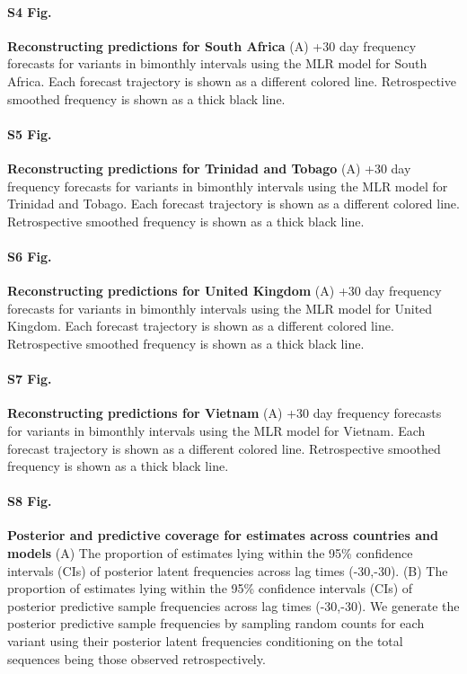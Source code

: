 \documentclass[10pt,letterpaper]{article}
\begin{document}
\paragraph*{S4 Fig.}
\label{fig:S4}
{\bf Reconstructing predictions for South Africa}
(A) +30 day frequency forecasts for variants in bimonthly intervals using the MLR model for South Africa.
		Each forecast trajectory is shown as a different colored line.
		Retrospective smoothed frequency is shown as a thick black line.

\paragraph*{S5 Fig.}
\label{fig:S4}
{\bf Reconstructing predictions for Trinidad and Tobago}
(A) +30 day frequency
forecasts for variants in bimonthly intervals using the MLR model for Trinidad and Tobago. Each
forecast trajectory is shown as a different colored line. Retrospective smoothed frequency is shown
as a thick black line.

\paragraph*{S6 Fig.}
\label{fig:S6}
{\bf Reconstructing predictions for United Kingdom}
(A) +30 day frequency forecasts for variants in bimonthly intervals using the MLR model for United Kingdom.
		Each forecast trajectory is shown as a different colored line.
		Retrospective smoothed frequency is shown as a thick black line.


\paragraph*{S7 Fig.}
\label{fig:S7}
{\bf Reconstructing predictions for Vietnam}
(A) +30 day frequency forecasts for variants in bimonthly intervals using the MLR model for Vietnam.
Each forecast trajectory is shown as a different colored line.
Retrospective smoothed frequency is shown as a thick black line.


\paragraph*{S8 Fig.}
\label{fig:S8}
{\bf Posterior and predictive coverage for estimates across countries and models}
(A) The proportion of estimates lying within the 95\% confidence intervals (CIs) of posterior latent frequencies across lag times (-30,-30).
(B) The proportion of estimates lying within the 95\% confidence intervals (CIs) of posterior predictive sample frequencies across lag times (-30,-30).
We generate the posterior predictive sample frequencies by sampling random counts for each variant using their posterior latent frequencies conditioning on the total sequences being those observed retrospectively.
\end{document}
